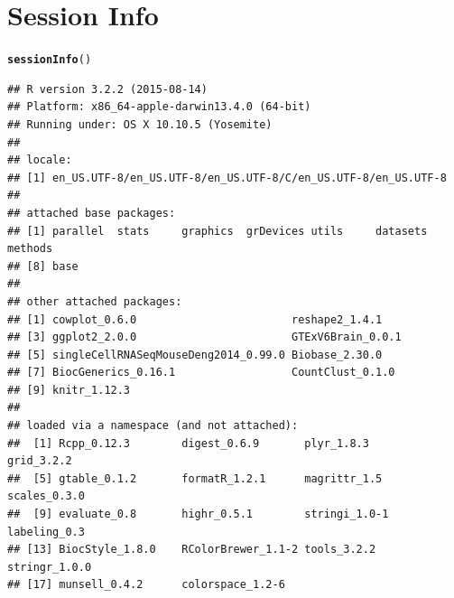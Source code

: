 \documentclass[12pt]{article}\usepackage[]{graphicx}\usepackage[usenames,dvipsnames]{color}
\makeatletter
\newcommand{\hlstd}[1]{\textcolor[rgb]{0.345,0.345,0.345}{#1}}%
\newcommand{\hlkwd}[1]{\textcolor[rgb]{0.737,0.353,0.396}{\textbf{#1}}}%
\newenvironment{kframe}{%
 \def\at@end@of@kframe{}%
 \ifinner\ifhmode%
  \def\at@end@of@kframe{\end{minipage}}%
  \begin{minipage}{\columnwidth}%
 \fi\fi%
 \def\FrameCommand##1{\hskip\@totalleftmargin \hskip-\fboxsep
 \colorbox{shadecolor}{##1}\hskip-\fboxsep
     \hskip-\linewidth \hskip-\@totalleftmargin \hskip\columnwidth}%
 \MakeFramed {\advance\hsize-\width
   \@totalleftmargin\z@ \linewidth\hsize
   \@setminipage}}%
 {\par\unskip\endMakeFramed%
 \at@end@of@kframe}
\newenvironment{knitrout}{}{} %
\makeatother
\begin{document}
% 

\section{Session Info}

\begin{knitrout}
\color{fgcolor}\begin{kframe}
\begin{alltt}
\hlkwd{sessionInfo}\hlstd{()}
\end{alltt}
\begin{verbatim}
## R version 3.2.2 (2015-08-14)
## Platform: x86_64-apple-darwin13.4.0 (64-bit)
## Running under: OS X 10.10.5 (Yosemite)
## 
## locale:
## [1] en_US.UTF-8/en_US.UTF-8/en_US.UTF-8/C/en_US.UTF-8/en_US.UTF-8
## 
## attached base packages:
## [1] parallel  stats     graphics  grDevices utils     datasets  methods  
## [8] base     
## 
## other attached packages:
## [1] cowplot_0.6.0                        reshape2_1.4.1                      
## [3] ggplot2_2.0.0                        GTExV6Brain_0.0.1                   
## [5] singleCellRNASeqMouseDeng2014_0.99.0 Biobase_2.30.0                      
## [7] BiocGenerics_0.16.1                  CountClust_0.1.0                    
## [9] knitr_1.12.3                        
## 
## loaded via a namespace (and not attached):
##  [1] Rcpp_0.12.3        digest_0.6.9       plyr_1.8.3         grid_3.2.2        
##  [5] gtable_0.1.2       formatR_1.2.1      magrittr_1.5       scales_0.3.0      
##  [9] evaluate_0.8       highr_0.5.1        stringi_1.0-1      labeling_0.3      
## [13] BiocStyle_1.8.0    RColorBrewer_1.1-2 tools_3.2.2        stringr_1.0.0     
## [17] munsell_0.4.2      colorspace_1.2-6
\end{verbatim}
\end{kframe}
\end{knitrout}
\end{document}
